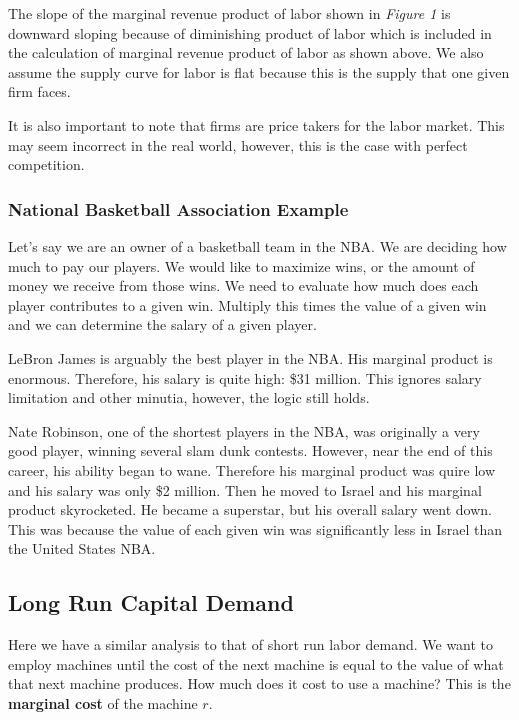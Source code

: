 \documentclass{article}
\begin{document}
The slope of the marginal revenue product of labor shown in \textit{Figure 1} is
downward sloping because of diminishing product of labor which is included in
the calculation of marginal revenue product of labor as shown above. We also
assume the supply curve for labor is flat because this is the supply that one
given firm faces.

It is also important to note that firms are price takers for the labor market.
This may seem incorrect in the real world, however, this is the case with
perfect competition. 

\subsubsection{National Basketball Association Example}

Let's say we are an owner of a basketball team in the NBA. We are deciding how
much to pay our players. We would like to maximize wins, or the amount of money
we receive from those wins. We need to evaluate how much does each player
contributes to a given win. Multiply this times the value of a given win and we
can determine the salary of a given player.

LeBron James is arguably the best player in the NBA. His marginal product is
enormous. Therefore, his salary is quite high: \$31 million. This ignores salary
limitation and other minutia, however, the logic still holds.

Nate Robinson, one of the shortest players in the NBA, was originally a very
good player, winning several slam dunk contests. However, near the end of this
career, his ability began to wane. Therefore his marginal product was quire low
and his salary was only \$2 million. Then he moved to Israel and his marginal
product skyrocketed. He became a superstar, but his overall salary went down.
This was because the value of each given win was significantly less in Israel
than the United States NBA.

\subsection{Long Run Capital Demand}

Here we have a similar analysis to that of short run labor demand. We want to
employ machines until the cost of the next machine is equal to the value of what
that next machine produces. How much does it cost to use a machine? This is the
\textbf{marginal cost} of the machine $r$.
\end{document}
